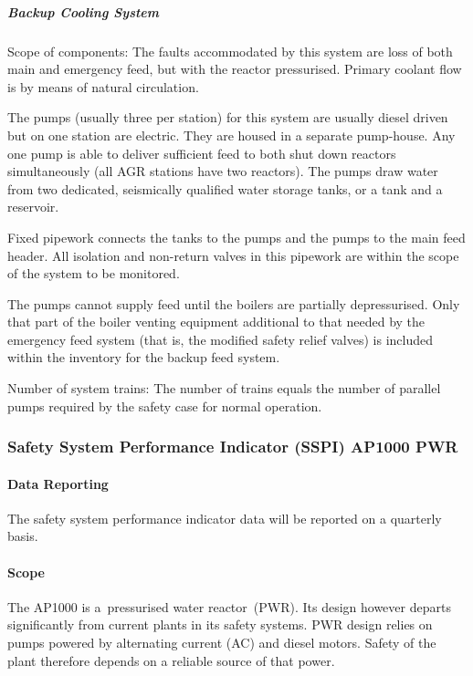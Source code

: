 \subparagraph{Backup Cooling System}

Scope of components: The faults accommodated by this system are loss
of both main and emergency feed, but with the reactor
pressurised. Primary coolant flow is by means of natural circulation.

The pumps (usually three per station) for this system are usually
diesel driven but on one station are electric. They are housed in a
separate pump-house. Any one pump is able to deliver sufficient feed
to both shut down reactors simultaneously (all AGR stations have two
reactors). The pumps draw water from two dedicated, seismically
qualified water storage tanks, or a tank and a reservoir.

Fixed pipework connects the tanks to the pumps and the pumps to the
main feed header. All isolation and non-return valves in this pipework
are within the scope of the system to be monitored.

The pumps cannot supply feed until the boilers are partially
depressurised. Only that part of the boiler venting equipment
additional to that needed by the emergency feed system (that is, the
modified safety relief valves) is included within the inventory for
the backup feed system.

Number of system trains: The number of trains equals the number of
parallel pumps required by the safety case for normal operation.

\subsubsection{Safety System Performance Indicator (SSPI) AP1000 PWR}
\paragraph{Data Reporting}

The safety system performance indicator data will be reported on a
quarterly basis.

\paragraph{Scope}

The AP1000 is a pressurised water reactor (PWR). Its design however
departs significantly from current plants in its safety systems. PWR
design relies on pumps powered by alternating current (AC) and diesel
motors. Safety of the plant therefore depends on a reliable source of
that power.

